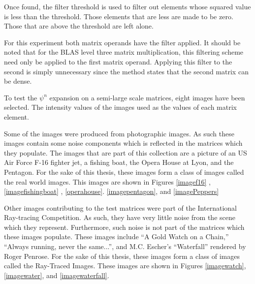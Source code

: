 Once found, the filter threshold is used to filter out elements whose squared value is less than the threshold.  Those elements that are less are made to be zero.   Those that are above the threshold are left alone.  

For this experiment both matrix operands have the filter applied.  It should be noted that for the BLAS level three matrix multiplication, this filtering scheme need only be applied to the first matrix operand.   Applying this filter to the second is simply unnecessary since the method states that the second matrix can be dense.  
%

To test the $\psi^n$ expansion on a semi-large scale matrices, eight images have been selected. The intensity values of the images used as the values of each matrix element.

Some of the images were produced from photographic images.  As such these images contain some noise components which is reflected in the matrices which they populate.  The images that are part of this collection are a picture of an US Air Force F-16 fighter jet, a fishing boat, the Opera House at Lyon, and the Pentagon.  For the sake of this thesis, these images form a class of images called the real world images.  This images are shown in Figures \ref{imagef16} ,\ref{imagefishingboat} , \ref{operahouse}. \ref{imagepentagon}, and \ref{imagePeppers}


Other images contributing to the test matrices were part of the International Ray-tracing Competition.  As such, they have very little noise from the scene which they represent.  Furthermore, such noise is not part of the matrices which these images populate.  These images include ``A Gold Watch on a Chain,'' ``Always running, never the same...'',  and M.C. Escher's ``Waterfall'' rendered by Roger Penrose.  For the sake of this thesis, these images form a class of images called the Ray-Traced Images.  These images are shown in Figures \ref{imagewatch}, \ref{imagewater}, and  \ref{imagewaterfall}.

